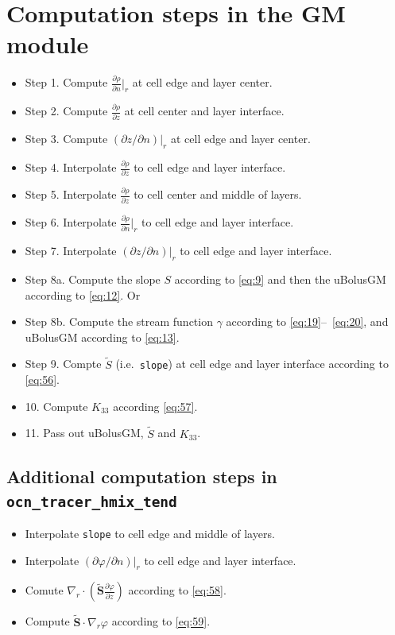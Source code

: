 \documentclass[12pt]{report}
\def\p{\partial}
\def\tilde{\widetilde}
\begin{document}
 \section{Computation steps in the GM module}
\label{sec:sequence-actions-gm}
\begin{itemize}
\item  Step 1. Compute $\frac{\p\rho}{\p n}|_r$ at cell edge and layer center.
\item Step 2. Compute $\frac{\p\rho}{\p z}$ at cell center and layer
  interface.
\item Step 3. Compute $(\p z/\p n)|_r$ at cell edge and layer center.
\item Step 4. Interpolate $\frac{\p\rho}{\p z}$ to cell edge and layer
  interface.
\item Step 5. Interpolate $\frac{\p\rho}{\p z}$ to cell center and
  middle of layers.
\item Step 6. Interpolate $\frac{\p\rho}{\p n}|_r$ to cell edge and
  layer interface.
\item Step 7. Interpolate $(\p z/\p n)|_r$ to cell edge and layer
  interface.
\item Step 8a. Compute the slope $S$ according to \eqref{eq:9} and then the uBolusGM according to
  \eqref{eq:12}. Or
\item Step 8b. Compute the stream function $\gamma$ according to
  \eqref{eq:19}--~\eqref{eq:20}, and uBolusGM according to
  \eqref{eq:13}.
\item Step 9. Compte $\tilde S$ (i.e.~{\tt slope}) at cell edge and layer interface
  according to \eqref{eq:56}.
\item 10. Compute $K_{33}$ according \eqref{eq:57}.
\item 11. Pass out uBolusGM, $\tilde S$ and $K_{33}$.
\end{itemize}

\subsection{Additional computation steps in {\tt 
    ocn\_tracer\_hmix\_tend}}
\label{sec:addit-comp-steps}
\begin{itemize}
\item Interpolate {\tt slope} to cell edge and middle of layers.
\item Interpolate $(\p\varphi/\p n)|_r$ to cell edge and layer interface.
\item Comute  $\nabla_r\cdot\left(\tilde{\mathbf{S}}\frac{\p\varphi}{\p
      z}\right)$ according to \eqref{eq:58}.
\item Compute $\tilde{\mathbf{S}}\cdot\nabla_r\varphi$ according to \eqref{eq:59}.
\end{itemize}
\end{document}
